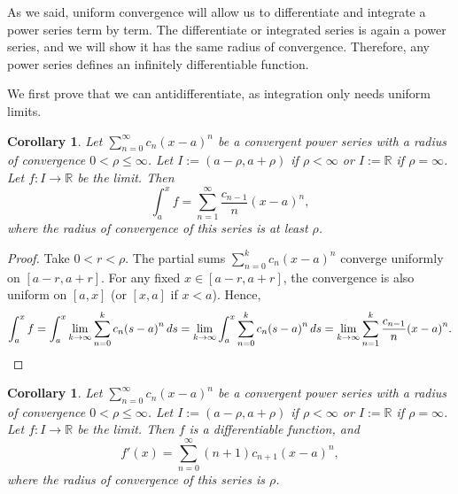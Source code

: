 \documentclass[12pt]{book}
\newcommand{\R}{{\mathbb{R}}}
\theoremstyle{plain}
\newtheorem{cor}[thm]{Corollary}
\theoremstyle{remark}
\theoremstyle{definition}
\theoremstyle{exercise}
\theoremstyle{example}
\begin{document}
As we said, uniform convergence will allow us to differentiate
and integrate a power series term by term.  The 
differentiate or integrated series is again a power series,
and we will show it has the same radius of convergence.
Therefore, 
any power series defines an infinitely differentiable function.

We first prove that we can antidifferentiate, as integration only needs
uniform limits.

\begin{cor}
Let $\sum_{n=0}^\infty c_n {(x-a)}^n$ be a convergent power series with a radius
of convergence $0 < \rho \leq \infty$.
Let $I := (a-\rho,a+\rho)$ if $\rho < \infty$
or $I := \R$ if $\rho= \infty$.  Let $f \colon I \to \R$ be the limit.
Then
\begin{equation*}
\int_a^x f = \sum_{n=1}^\infty \frac{c_{n-1}}{n} {(x-a)}^{n} ,
\end{equation*}
where the radius of convergence of this series is at least $\rho$.
\end{cor}

\begin{proof}
Take $0 < r < \rho$.
The partial sums $\sum_{n=0}^k c_n {(x-a)}^n$ converge uniformly on $[a-r,a+r]$.
For any fixed $x \in [a-r,a+r]$, the convergence is also uniform
on $[a,x]$ (or $[x,a]$ if $x < a$).
Hence,
\begin{equation*}
\int_a^x f =
\int_a^x \lim_{k\to\infty} \sum_{n=0}^k c_n {(s-a)}^n \, ds
=
\lim_{k\to\infty}
\int_a^x \sum_{n=0}^k c_n {(s-a)}^n \, ds
=
\lim_{k\to\infty}
\sum_{n=1}^k \frac{c_{n-1}}{n} {(x-a)}^{n} . \qedhere
\end{equation*}
\end{proof}



\begin{cor}
Let $\sum_{n=0}^\infty c_n {(x-a)}^n$ be a convergent power series with a radius
of convergence $0 < \rho \leq \infty$.
Let $I := (a-\rho,a+\rho)$ if $\rho < \infty$
or $I := \R$ if $\rho= \infty$.  Let $f \colon I \to \R$ be the limit.
Then $f$ is a differentiable function, and
\begin{equation*}
f'(x) = \sum_{n=0}^\infty (n+1) c_{n+1} {(x-a)}^{n} ,
\end{equation*}
where the radius of convergence of this series is $\rho$.
\end{cor}
\end{document}
